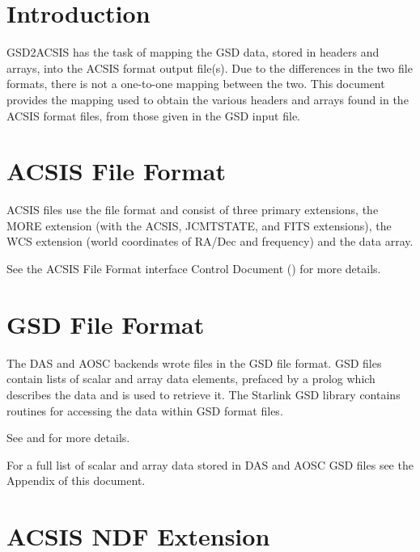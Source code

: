 \documentclass[twoside,11pt,nolof]{starlink}
\begin{document}
\scfrontmatter


\section{Introduction}
GSD2ACSIS has the task of mapping the GSD data, stored in headers and arrays, into the ACSIS format output file(s).  Due to the differences in the two file formats, there is not a one-to-one mapping between the two.  This document provides the mapping used to obtain the various headers and arrays found in the ACSIS format files, from those given in the GSD input file.

\section{ACSIS File Format}
ACSIS files use the  file format and consist of three primary extensions, the MORE extension (with the ACSIS, JCMTSTATE, and FITS extensions), the WCS extension (world coordinates of RA/Dec and frequency) and the data array.

See the ACSIS File Format interface Control Document () for more details.

\section{GSD File Format}
The DAS and AOSC backends wrote files in the GSD file format.  GSD files contain lists of scalar and array data elements, prefaced by a prolog which describes the data and is used to retrieve it.  The Starlink GSD library contains routines for accessing the data within GSD format files.

See  and  for more details.

For a full list of scalar and array data stored in DAS and AOSC GSD files see the Appendix of this document.

\section{ACSIS NDF Extension}
\end{document}
